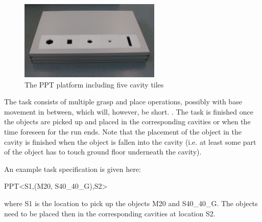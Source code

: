 \begin{figure}
\centering
\includegraphics[width=0.6\textwidth ]{../images/ppt_plattform.jpg}
\caption{The PPT platform including five cavity tiles}
\label{fig:ppt_plattform}
\end{figure}

The task consists of multiple grasp and place operations, possibly with base movement in between, which will, however, be short. . The task is finished once the objects are picked up and placed in the corresponding cavities or when the time foreseen for the run ends. Note that the placement of the object in the cavity is finished when the object is fallen into the cavity (i.e. at least some part of the object has to touch ground floor underneath the cavity).
\par
{}
\par
An example task specification is given here:
\begin{center}
PPT\textless S1,(M20, S40\_40\_G),S2\textgreater
\end{center}
where S1 is the location to pick up the objects M20 and S40\_40\_G. The objects need to be placed then in the corresponding cavities at location S2.
%
%
%

